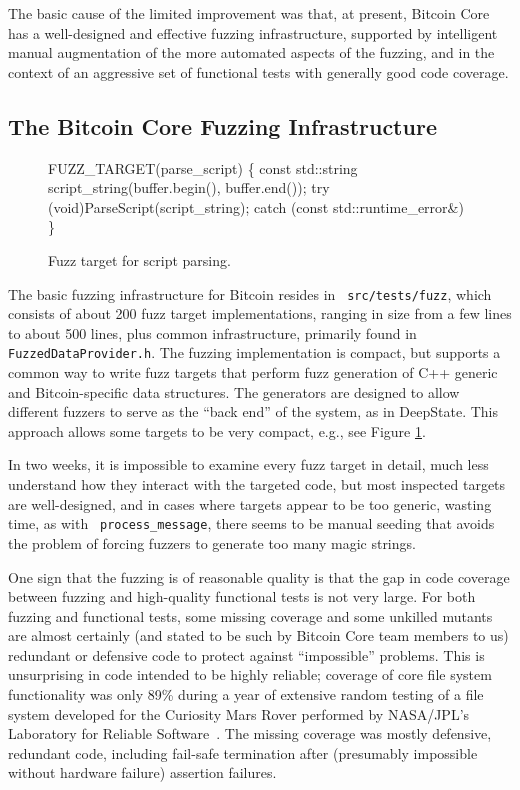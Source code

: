The basic cause of the limited improvement was that, at present,
Bitcoin Core has a well-designed and effective fuzzing infrastructure,
supported by intelligent manual augmentation of the more automated
aspects of the fuzzing, and in the context of an aggressive set of
functional tests with generally good code coverage.

\subsection{The Bitcoin Core Fuzzing Infrastructure}

\begin{figure}
  {
  \begin{code}
FUZZ\_TARGET(parse\_script)
\{
    const std::string script\_string(buffer.begin(),
       buffer.end());
    try {
        (void)ParseScript(script\_string);
    } catch (const std::runtime\_error\&) {
    }
\}
\end{code}
}
\caption{Fuzz target for script parsing.}
\label{script}
\end{figure}
  

\begin{sloppypar}
The basic fuzzing infrastructure for Bitcoin resides in {\tt
  src/tests/fuzz}, which consists of about 200 fuzz target
implementations, ranging in size from a few lines to about 500 lines,
plus common infrastructure, primarily found in {\tt
  FuzzedDataProvider.h}.  The fuzzing implementation is compact, but
supports a common way to write fuzz targets that perform fuzz
generation of C++ generic and Bitcoin-specific data structures.  The
generators are designed to allow different fuzzers to serve as the
``back end'' of the system, as in DeepState.  This approach allows
some targets to be very compact, e.g., see Figure \ref{script}.

In two weeks, it is impossible to examine every fuzz target in detail,
much less understand how they interact with the targeted code, but
most inspected targets are well-designed, and in cases where targets
appear to be too generic, wasting time, as with {\tt
  process\_message}, there seems to be manual seeding that avoids the
problem of forcing fuzzers to generate too many magic strings.
\end{sloppypar}

One sign that the fuzzing is of reasonable quality is that the gap in code
coverage between fuzzing and high-quality
functional tests is not very large.  
For both fuzzing and functional tests, some missing coverage and some
unkilled mutants are almost
certainly (and stated to be such by Bitcoin Core team members to us)
redundant or defensive code to protect against ``impossible''
problems.  This is unsurprising in code intended to be highly reliable;
coverage of core file system functionality was only 89\% during a year of
extensive random testing of a file system developed for the Curiosity
Mars Rover performed by NASA/JPL's Laboratory for Reliable
Software~\cite{ICSEDiff}.  The missing coverage was mostly defensive,
redundant code, including fail-safe termination after (presumably
impossible without hardware failure)
assertion failures.

